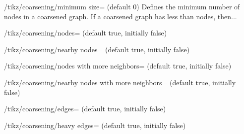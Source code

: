 \begin{key}{/tikz/coarsening/minimum size= (default 0)}
  Defines the minimum number of nodes in a coarsened graph. If a
  coarsened graph has less than  nodes, then... %
  \begin{codeexample}[] 
  \end{codeexample}
\end{key}

\begin{key}{/tikz/coarsening/nodes= (default true,
  initially false)}
  \begin{codeexample}[]
  \end{codeexample}
\end{key}

\begin{key}{/tikz/coarsening/nearby nodes= (default
  true, initially false)}
  \begin{codeexample}[]
  \end{codeexample}
\end{key}

\begin{key}{/tikz/coarsening/nodes with more 
  neighbors= (default true, initially false)}
  \begin{codeexample}[]
  \end{codeexample}
\end{key}

\begin{key}{/tikz/coarsening/nearby nodes with more 
  neighbors= (default true, initially false)}
  \begin{codeexample}[]
  \end{codeexample}
\end{key}

\begin{key}{/tikz/coarsening/edges= (default true,
  initially false)}
  \begin{codeexample}[]
  \end{codeexample}
\end{key}

\begin{key}{/tikz/coarsening/heavy edges= (default
  true, initially false)}
  \begin{codeexample}[]
  \end{codeexample}
\end{key}


